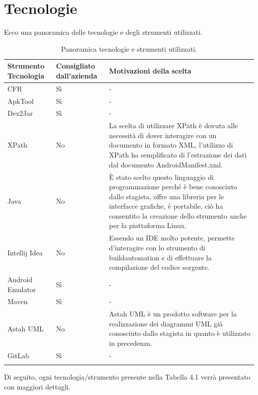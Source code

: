 

\section{Tecnologie}\label{sec:tecnologie}
Ecco una panoramica delle tecnologie e degli strumenti utilizzati.
\begin{center}
    \begin{longtable}{ | C{3cm}| C{3cm} |C{7cm} |}
        \hline
        \textbf{Strumento Tecnologia} &
        \textbf{Consigliato dall'azienda}&
        \textbf{Motivazioni della scelta} \\\hline
        CFR & Sì & - \\\hline
        ApkTool& Sì & - \\\hline
        Dex2Jar& Sì & - \\\hline
        XPath& No & La scelta di utilizzare XPath è dovuta alle necessità di dover interagire con un documento in formato XML, l'utilizzo di XPath ha semplificato di l'estrazione dei dati dal documento AndroidManifest.xml.\\\hline
        Java& No & È stato scelto questo linguaggio di programmazione perché è bene conosciuto dallo stagista, offre una libreria per le interfacce grafiche, è portabile, ciò ha consentito la creazione dello strumento anche per la piattaforma Linux.\\\hline
        Intellij Idea& No & Essendo un IDE molto potente, permette d'interagire con lo strumento di \gls{buildautomation} e di effettuare la compilazione del codice sorgente.\\\hline
        Android Emulator& Sì & - \\\hline
        Maven& Sì & - \\\hline
        Astah UML& No & Astah UML è un prodotto software per la realizzazione dei diagrammi UML già conosciuto dallo stagista in quanto è utilizzato in precedenza.\\\hline
        GitLab& Sì & -\\\hline
        \caption{Panoramica tecnologie e strumenti utilizzati.}
    \end{longtable}
\end{center}

Di seguito, ogni tecnologia/strumento presente nella Tabella 4.1 verrà presentato con maggiori dettagli.
